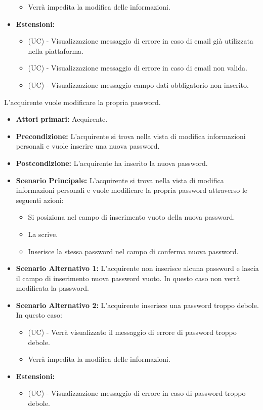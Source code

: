 \begin{itemize}
\begin{itemize}
        \item Verrà impedita la modifica delle informazioni.
    \end{itemize}
    \item \textbf{Estensioni:}
    \begin{itemize}
        \item (UC) - Visualizzazione messaggio di errore in caso di email già utilizzata nella piattaforma.
        \item (UC) - Visualizzazione messaggio di errore in caso di email non valida.
        \item (UC) - Visualizzazione messaggio campo dati obbligatorio non inserito.
    \end{itemize}
\end{itemize}

L'acquirente vuole modificare la propria password.
\begin{itemize}
    \item \textbf{Attori primari:} Acquirente.
    \item \textbf{Precondizione:} L'acquirente si trova nella vista di modifica informazioni personali e vuole inserire una nuova password.
    \item \textbf{Postcondizione:} L'acquirente ha inserito la nuova password.
    \item \textbf{Scenario Principale:} L'acquirente si trova nella vista di modifica informazioni personali e vuole modificare la propria password attraverso le seguenti azioni:
        \begin{itemize}
            \item Si posiziona nel campo di inserimento vuoto della nuova password.
            \item La scrive.
            \item Inserisce la stessa password nel campo di conferma nuova password.
        \end{itemize}
    \item \textbf{Scenario Alternativo 1:} L'acquirente non inserisce alcuna password e lascia il campo di inserimento nuova password vuoto. In questo caso non verrà modificata la password.
    \item \textbf{Scenario Alternativo 2:} L'acquirente inserisce una password troppo debole. In questo caso:
    \begin{itemize}
        \item (UC) - Verrà visualizzato il messaggio di errore di password troppo debole.
        \item Verrà impedita la modifica delle informazioni.
    \end{itemize}
    \item \textbf{Estensioni:}
    \begin{itemize}
        \item (UC) - Visualizzazione messaggio di errore in caso di password troppo debole.
    \end{itemize}
\end{itemize}

